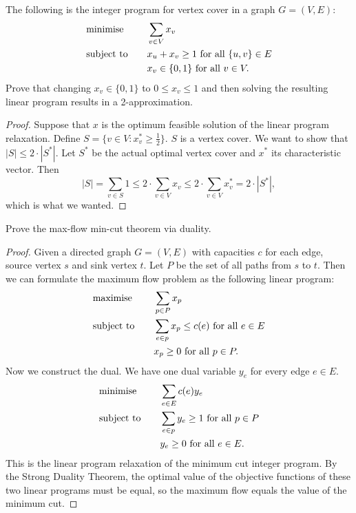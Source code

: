 \documentclass[12pt]{article}
\newenvironment{problem}[2][Problem]{\begin{trivlist}
\item[\hskip \labelsep {\bfseries #1}\hskip \labelsep {\bfseries #2.}]}{\end{trivlist}}
\theoremstyle{plain}
\begin{document}
\begin{problem}{4}
    The following is the integer program for vertex cover in a graph $G=(V,E)$:
    \begin{alignat*}{2}
        & \textup{minimise} & \quad & \sum_{v\in V}x_v\\
        & \textup{subject to} & & x_u + x_v \geq 1\ \text{for all}\ \{u,v\}\in E\\
        &  & & x_v\in\{0,1\}\ \text{for all}\ v\in V.
    \end{alignat*}
    Prove that changing $x_v\in \{0,1\}$ to $0\leq x_v\leq 1$ and then solving the resulting linear program results in a 2-approximation.
\end{problem}
\begin{proof}
    Suppose that $x$ is the optimum feasible solution of the linear program relaxation. Define $S=\{v\in V: x_v^* \geq \frac{1}{2}\}$. $S$ is a vertex cover. We want to show that $|S| \leq 2\cdot|S^*|$. Let $S^*$ be the actual optimal vertex cover and $x^*$ its characteristic vector. Then
    $$ |S| = \sum_{v\in S} 1 \leq 2\cdot\sum_{v\in V} x_v \leq 2\cdot\sum_{v\in V}x^*_v = 2\cdot|S^*|,$$
    which is what we wanted.
\end{proof}

\begin{problem}{5}
    Prove the max-flow min-cut theorem via duality.
\end{problem}
\begin{proof}
    Given a directed graph $G=(V,E)$ with capacities $c$ for each edge, source vertex $s$ and sink vertex $t$. Let $P$ be the set of all paths from $s$ to $t$. Then we can formulate the maximum flow problem as the following linear program:
    \begin{alignat*}{2}
        & \textup{maximise} & \quad & \sum_{p\in P} x_p\\
        & \textup{subject to} & & \sum_{e\in p} x_p \leq c(e)\ \text{for all}\ e\in E\\
        &  & & x_p \geq 0\ \text{for all}\ p\in P.
    \end{alignat*}
    Now we construct the dual. We have one dual variable $y_e$ for every edge $e\in E$.
    \begin{alignat*}{2}
        & \textup{minimise} &\quad & \sum_{e\in E} c(e)y_e\\
        & \textup{subject to} & & \sum_{e\in p} y_e\geq 1\ \text{for all}\ p\in P\\
        &  & & y_e\geq 0\ \text{for all}\ e\in E.
    \end{alignat*}
    This is the linear program relaxation of the minimum cut integer program. By the Strong Duality Theorem, the optimal value of the objective functions of these two linear programs must be equal, so the maximum flow equals the value of the minimum cut.
\end{proof}
\end{document}
